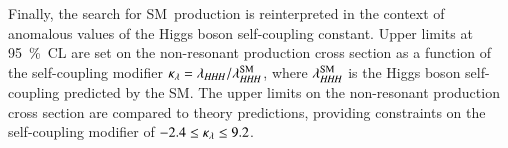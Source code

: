 Finally, the search for SM~\HH production is reinterpreted in the context of
anomalous values of the Higgs boson self-coupling constant. Upper limits at
\SI{95}{\percent}~CL are set on the non-resonant \HH production cross section as
a function of the self-coupling modifier
$\kappa_{\lambda} = \lambda_{H\mkern-1.5muH\mkern-1.5muH} / \lambda_{H\mkern-1.5muH\mkern-1.5muH}^{\text{SM}}$, where $\lambda_{H\mkern-1.5muH\mkern-1.5muH}^{\text{SM}}$
is the Higgs boson self-coupling predicted by the SM. The upper limits on the
non-resonant \HH production cross section are compared to theory predictions,
providing constraints on the self-coupling modifier of
$\num{-2.4} \leq \kappa_{\lambda} \leq 9.2$.

